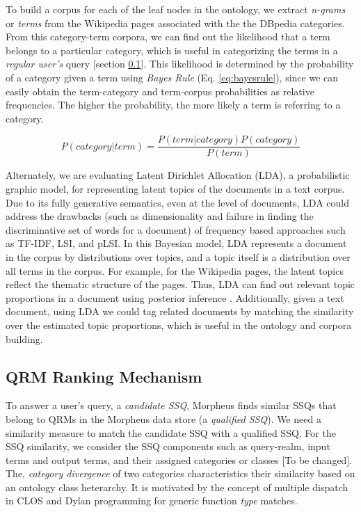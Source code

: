 To build a corpus for each of the leaf nodes in the ontology, 
we extract \emph{n-grams} or \emph{terms} from the Wikipedia pages associated with the 
the DBpedia categories\cite{Bizer2009}. From this category-term corpora, 
we can find out the likelihood that a term belongs to a particular category, 
which is useful in categorizing the terms in a \emph{regular user's} query [section \ref{sec:qrm_ranking}].    
This likelihood is determined by the probability of a category given a term 
using \textit{Bayes Rule} (Eq. \ref{eq:bayesrule}), since we can 
easily obtain the term-category and term-corpus probabilities as 
relative frequencies. The higher the probability, the more likely a 
term is referring to a category. 

\begin{equation}
\label{eq:bayesrule}
P (category | term) = \frac{P(term | category) P(category)}{P(term)}
\end{equation}    

Alternately, we are evaluating Latent Dirichlet Allocation (LDA), a probabilistic graphic model, for
representing latent topics of the documents in a text corpus\cite{Blei2003latentdirichlet}.
Due to its fully generative semantics, even at 
the level of documents, LDA could address the drawbacks 
(such as dimensionality and failure in finding the discriminative set of 
words for a document) of frequency based approaches such as TF-IDF, LSI, and pLSI. In
this Bayesian model, LDA represents a document in the corpus by
distributions over topics, and a topic itself is a distribution over all 
terms in the corpus.  For example, for the Wikipedia pages, the latent
topics reflect the thematic structure of the pages. Thus, LDA
can find out relevant topic proportions in a document using posterior inference
\cite{Blei2003latentdirichlet}. Additionally, given a text document, using LDA
we could tag related documents by matching the similarity over the estimated
topic proportions, which is useful in the ontology and corpora building.   

\subsection{QRM Ranking Mechanism} 
\label{sec:qrm_ranking}

To answer a user's query, a \textit{candidate
SSQ}, Morpheus finds similar SSQs that belong to QRMs in the Morpheus data store (a \textit{qualified SSQ}). We need a similarity measure to match the candidate SSQ
with a qualified SSQ. For the SSQ similarity, we
consider the SSQ components such as query-realm, input
terms and output terms, and their assigned categories or classes [To be changed]. The,
\textit{category divergence} of two categories characteristics their 
similarity based on an ontology class heterarchy. 
It is motivated by the concept of multiple
dispatch in CLOS and Dylan programming for generic function \emph{type} matches. 


